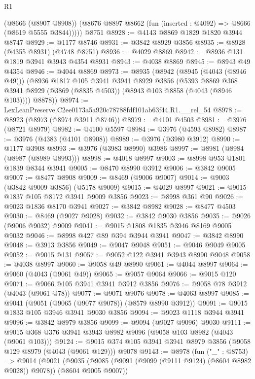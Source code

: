 \begin{lexlean}{R1}
\begin{coremodule}
        (@8666 (@8907 @8908))
        (@8676 @8897 @8662 (fun (inserted : @4092) => @8666 (@8619 @5555 @3844)))))
    @8751
@8928 := @4143 @8869 @1829 @1820 @3944 @8747
@8929 := @1177 @8746
@8931 := @3842 @8929 @3856
@8935 := @8928 (@4355 @8931) (@4748 @8751)
@8936 := @4029 @8869
@8942 := @8936 @131 @1819 @3941 @3943 @4354 @8931
@8943 := @4038 @8869
@8945 := @8943 @49 @4354
@8946 := @4044 @8869
@8973 := @8935
    (@8942
      (@8945 (@4043 (@8946 @49)))
      (@8936
        @1817
        @105
        @3941
        @3941
        @8929
        @3856
        (@5393 @8869 @368 @3941 @8929 (@3869 (@8835 @4503)) (@8943 @103 @8858 (@4043 (@8946 @103))))
        @8878))
@8974 := LexLeanPreserve.C2ee0173a5a920c78788fdf101ab63f44.R1.__rel_54
@8978 := @8923 (@8973 (@8974 @3911 @8746))
@8979 := @4101 @4503
@8981 := @3976 (@8721 @8979)
@8982 := @4100 @5597
@8984 := @3976 (@4593 @8982)
@8987 := @3976 (@4383 (@4101 @8908))
@8989 := @3976 (@3980 @3912)
@8990 := @1177 @3908
@8993 := @3976 (@3983 @8990) @3986
@8997 := @8981 (@8984 (@8987 (@8989 @8993)))
@8998 := @4018 @8997
@9003 := @8998 @953 @1801 @1839 @8344 @3941
@9005 := @8470 @8990 @3912
@9006 := @3842 @9005
@9007 := @8477 @8908
@9009 := @8469 (@9006 @9007)
@9014 := @9003 (@3842 @9009 @3856) (@5178 @9009)
@9015 := @4029 @8997
@9021 := @9015 @1837 @105 @8172 @3941 @9009 @3856
@9023 := @8998 @361 @90
@9026 := @9023 @1836 @8170 @3941
@9027 := @3842 @8982
@9028 := @8477 @4503
@9030 := @8469 (@9027 @9028)
@9032 := @3842 @9030 @3856
@9035 := @9026 (@9006 @9032) @9009
@9041 := @9015 @1808 @1835 @3946 @8169 @9005 @9032
@9046 := @8998 @427 @89 @394 @3944 @3941
@9047 := @3842 @8990
@9048 := @3913 @3856
@9049 := @9047 @9048
@9051 := @9046 @9049 @9005
@9052 := @9015 @131
@9057 := @9052 @122 @3941 @3943 @8990 @9048
@9058 := @4038 @8997
@9060 := @9058 @49 @8990
@9061 := @4044 @8997
@9064 := @9060 (@4043 (@9061 @49))
@9065 := @9057 @9064
@9066 := @9015 @120
@9071 := @9066 @105 @3941 @3941 @3912 @3856
@9076 := @9058 @78 @3912 (@4043 (@9061 @78))
@9077 := @9071 @9076
@9078 := @4063 @8997
@9085 := @9041 (@9051 (@9065 (@9077 @9078)) (@8579 @8990 @3912))
@9091 := @9015 @1833 @105 @3946 @3941 @9030 @3856
@9094 := @9023 @1118 @3944 @3941
@9096 := @3842 @8979 @3856
@9099 := @9094 (@9027 @9096) @9030
@9111 := @9015 @368 @376 @3941 @3943 @8982 @9096 (@9058 @103 @8982 (@4043 (@9061 @103)))
@9124 := @9015 @374 @105 @3941 @3941 @8979 @3856 (@9058 @129 @8979 (@4043 (@9061 @129))) @9078
@9143 := @8978
    (fun ("_" : @8753) =>
    @9014
      (@9021
        (@9035 (@9085 (@9091 (@9099 (@9111 @9124) (@8604 @8982 @9028)) @9078)) (@8604 @9005 @9007))

\end{coremodule}
\end{lexlean}
